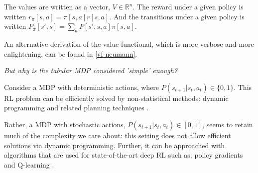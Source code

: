 The values are written as a vector, $V \in \mathbb R^n$.
The reward under a given policy is written $r_{\pi}[s, a] = \pi[s, a] r[s, a]$.
And the transitions under a given policy is written $P_{\pi}[s', s] = \sum_a P[s', s, a]\pi[s, a]$.

An alternative derivation of the value functional, which is more verbose and more enlightening, can be found in \ref{vf-neumann}.

\begin{displayquote}
\textsl{But why is the tabular MDP considered 'simple' enough?}
\end{displayquote}

Consider a MDP with deterministic actions, where $P(s_{t+1}|s_t, a_t) \in \{ 0, 1\}$.
This RL problem can be efficiently solved by non-statistical
methods: dynamic programming and related planning techniques \cite{Bertsekas1995}.

Rather, a MDP with stochastic actions, $P(s_{t+1}|s_t, a_t) \in [0, 1]$,
seems to retain much of the complexity we care about: this setting does not allow
efficient solutions via dynamic programming. Further, it can be approached with algorithms
that are used for state-of-the-art deep RL such as;
policy gradients \cite{Schulman2015a} and Q-learning \cite{Mnih2015}.
